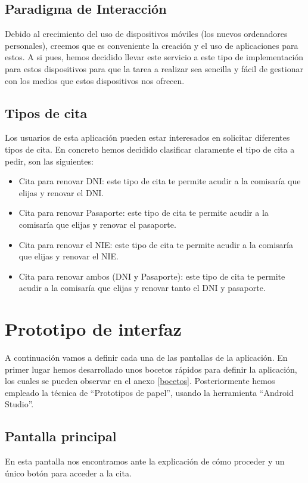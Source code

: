 \documentclass[a4paper,11pt]{article}
\begin{document}
\subsection{Paradigma de Interacción}
Debido al crecimiento del uso de dispositivos móviles (los nuevos ordenadores personales), creemos que es conveniente la creación y el uso de aplicaciones para estos. A si pues, hemos decidido llevar este servicio a este tipo de implementación para estos dispositivos para que la tarea a realizar sea sencilla y fácil de gestionar con los medios que estos dispositivos nos ofrecen.

\subsection{Tipos de cita}
Los usuarios de esta aplicación pueden estar interesados en solicitar diferentes tipos de cita. En concreto hemos decidido clasificar claramente el tipo de cita a pedir, son las siguientes:

\begin{itemize}
  \item Cita para renovar DNI: este tipo de cita te permite acudir a la comisaría que elijas y renovar el DNI.
  \item Cita para renovar Pasaporte: este tipo de cita te permite acudir a la comisaría que elijas y renovar el pasaporte.
  \item Cita para renovar el NIE: este tipo de cita te permite acudir a la comisaría que elijas y renovar el NIE.
  \item Cita para renovar ambos (DNI y Pasaporte): este tipo de cita te permite acudir a la comisaría que elijas y renovar tanto el DNI y pasaporte.
\end{itemize}

\section{Prototipo de interfaz}
A continuación vamos a definir cada una de las pantallas de la aplicación. En primer lugar hemos desarrollado unos bocetos rápidos para definir la aplicación, los cuales se pueden observar en el anexo \ref{bocetos}. Posteriormente hemos empleado la técnica de “Prototipos de papel”, usando la herramienta “Android Studio”.

\subsection{Pantalla principal}
En esta pantalla nos encontramos ante la explicación de cómo proceder y un único botón para acceder a la cita.
\end{document}
